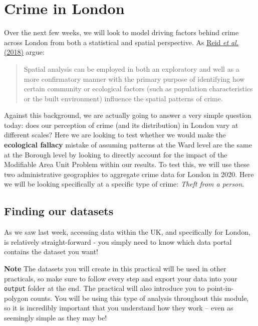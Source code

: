 \documentclass[
]{book}
\begin{document}
\hypertarget{crime-in-london}{%
\section{Crime in London}\label{crime-in-london}}

Over the next few weeks, we will look to model driving factors behind crime across London from both a statistical and spatial perspective. As \href{https://www.oxfordbibliographies.com/view/document/obo-9780195396607/obo-9780195396607-0123.xml}{Reid \emph{et al.} (2018)} argue:

\begin{quote}
Spatial analysis can be employed in both an exploratory and well as a more confirmatory manner with the primary purpose of identifying how certain community or ecological factors (such as population characteristics or the built environment) influence the spatial patterns of crime.
\end{quote}

Against this background, we are actually going to answer a very simple question today: does our perception of crime (and its distribution) in London vary at different scales? Here we are looking to test whether we would make the \textbf{ecological fallacy} mistake of assuming patterns at the Ward level are the same at the Borough level by looking to directly account for the impact of the Modifiable Area Unit Problem within our results. To test this, we will use these two administrative geographies to aggregate crime data for London in 2020. Here we will be looking specifically at a specific type of crime: \emph{Theft from a person}.

\hypertarget{w03-finding}{%
\subsection{Finding our datasets}\label{w03-finding}}

As we saw last week, accessing data within the UK, and specifically for London, is relatively straight-forward - you simply need to know which data portal contains the dataset you want!

\textbf{Note}
The datasets you will create in this practical will be used in other practicals, so make sure to follow every step and export your data into your \texttt{output} folder at the end. The practical will also introduce you to point-in-polygon counts. You will be using this type of analysis throughout this module, so it is incredibly important that you understand how they work -- even as seemingly simple as they may be!
\end{document}
